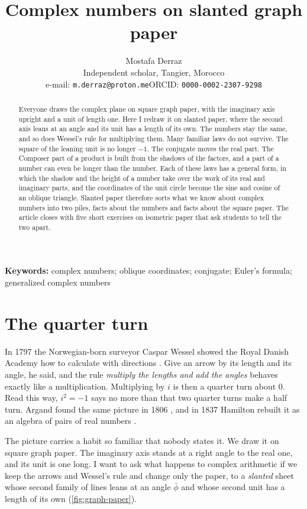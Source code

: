 \documentclass[11pt,a4paper]{article}
\title{Complex numbers on slanted graph paper}
\author{Mostafa Derraz\\[2pt]
\small Independent scholar, Tangier, Morocco\\
\small e-mail: \texttt{m.derraz@proton.me}\quad ORCID: \texttt{0000-0002-2307-9298}}
\date{}
\theoremstyle{plain}
\theoremstyle{definition}
\newcommand{\pb}{\bar{\phi}}                     %
\begin{document}
\maketitle

\begin{abstract}
\noindent Everyone draws the complex plane on square graph paper, with the imaginary axis upright and a unit of length one. Here I redraw it on slanted paper, where the second axis leans at an angle and its unit has a length of its own. The numbers stay the same, and so does Wessel's rule for multiplying them. Many familiar laws do not survive. The square of the leaning unit is no longer $-1$. The conjugate moves the real part. The Composer part of a product is built from the shadows of the factors, and a part of a number can even be longer than the number. Each of these laws has a general form, in which the shadow and the height of a number take over the work of its real and imaginary parts, and the coordinates of the unit circle become the sine and cosine of an oblique triangle. Slanted paper therefore sorts what we know about complex numbers into two piles, facts about the numbers and facts about the square paper. The article closes with five short exercises on isometric paper that ask students to tell the two apart.
\end{abstract}

\noindent\textbf{Keywords:} complex numbers; oblique coordinates; conjugate; Euler's formula; generalized complex numbers

\section{The quarter turn}

In 1797 the Norwegian-born surveyor Caspar Wessel showed the Royal Danish Academy how to calculate with directions \cite{Wessel}. Give an arrow by its length and its angle, he said, and the rule \emph{multiply the lengths and add the angles} behaves exactly like a multiplication. Multiplying by $i$ is then a quarter turn about $0$. Read this way, $i^2 = -1$ says no more than that two quarter turns make a half turn. Argand found the same picture in 1806 \cite{Argand}, and in 1837 Hamilton rebuilt it as an algebra of pairs of real numbers \cite{Hamilton}.

The picture carries a habit so familiar that nobody states it. We draw it on square graph paper. The imaginary axis stands at a right angle to the real one, and its unit is one long. I want to ask what happens to complex arithmetic if we keep the arrows and Wessel's rule and change only the paper, to a \emph{slanted} sheet whose second family of lines leans at an angle $\pb$ and whose second unit has a length of its own (\cref{fig:graph-paper}).
\end{document}
